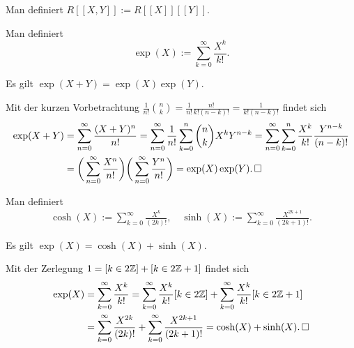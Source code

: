\begin{Definition}\newlinefirst
Man definiert $R[[X,Y]]:=R[[X]][[Y]]$.
\end{Definition}

\begin{Definition}[Exponentialreihe] Man definiert
\[\exp(X) := \sum_{k=0}^\infty \frac{X^k}{k!}.\]
\end{Definition}

\begin{Satz}
Es gilt $\exp(X+Y) = \exp(X)\exp(Y)$.
\end{Satz}
\begin{Beweis}
Mit der kurzen Vorbetrachtung
$\frac{1}{n!}\binom{n}{k} = \frac{1}{n!}\frac{n!}{k!(n-k)!} = \frac{1}{k!(n-k)!}$
findet sich
\begin{align*}
\exp(X+Y) &= \sum_{n=0}^\infty\frac{(X+Y)^n}{n!}
= \sum_{n=0}^\infty\frac{1}{n!}\sum_{k=0}^n\binom{n}{k}X^k Y^{n-k}
= \sum_{n=0}^\infty\sum_{k=0}^n\frac{X^k}{k!}\frac{Y^{n-k}}{(n-k)!}\\
&= \bigg(\sum_{n=0}^\infty\frac{X^n}{n!}\bigg)
\bigg(\sum_{n=0}^\infty\frac{Y^n}{n!}\bigg)
= \exp(X)\exp(Y).\,\square
\end{align*}
\end{Beweis}

\begin{Definition} Man definiert
\begin{gather*}
\cosh(X) := \sum_{k=0}^\infty \frac{X^k}{(2k)!},\quad
\sinh(X) := \sum_{k=0}^\infty \frac{X^{2k+1}}{(2k+1)!}.
\end{gather*}
\end{Definition}

\begin{Satz}%
\label{exp-parity}\newlinefirst
Es gilt $\exp(X)=\cosh(X)+\sinh(X)$.
\end{Satz}
\begin{Beweis}
Mit der Zerlegung $1 = [k\in 2\mathbb Z] + [k\in 2\mathbb Z+1]$ findet sich
\begin{align*}
\exp(X) &= \sum_{k=0}^\infty\frac{X^k}{k!}
= \sum_{k=0}^\infty\frac{X^k}{k!}[k\in 2\mathbb Z] + \sum_{k=0}^\infty\frac{X^k}{k!}[k\in 2\mathbb Z+1]\\
&= \sum_{k=0}^\infty\frac{X^{2k}}{(2k)!}
+ \sum_{k=0}^\infty\frac{X^{2k+1}}{(2k+1)!}
= \cosh(X) + \sinh(X).\,\square
\end{align*}
\end{Beweis}

